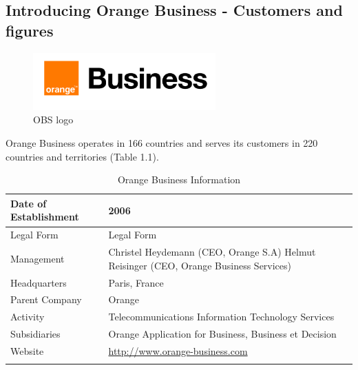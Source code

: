 \subsection{Introducing Orange Business - Customers and figures}
\begin{figure}[H] 
  \centering
  \includegraphics[width=7cm]{Logos/ob.png}
  \caption{OBS logo}
\end{figure}

Orange Business operates in 166 countries and serves its customers in 220 countries and territories (Table 1.1).
\newpage
\begin{longtable}[c]{| m{4.4cm} | m{11cm} |}
          \hline
          Date of Establishment & 2006 \\
          \hline
          Legal Form & Legal Form \\
          \hline
          Management & Christel Heydemann (CEO, Orange S.A)
          Helmut Reisinger (CEO, Orange Business Services) \\
          \hline
          Headquarters & Paris, France \\
          \hline
          Parent Company & Orange \\
          \hline
          Activity & Telecommunications
          Information Technology Services \\
          \hline
          Subsidiaries & Orange Application for Business, Business et Decision \\
          \hline
          Website & \url{http://www.orange-business.com} \\
          \hline
          \caption{Orange Business Information}\\
\end{longtable}

